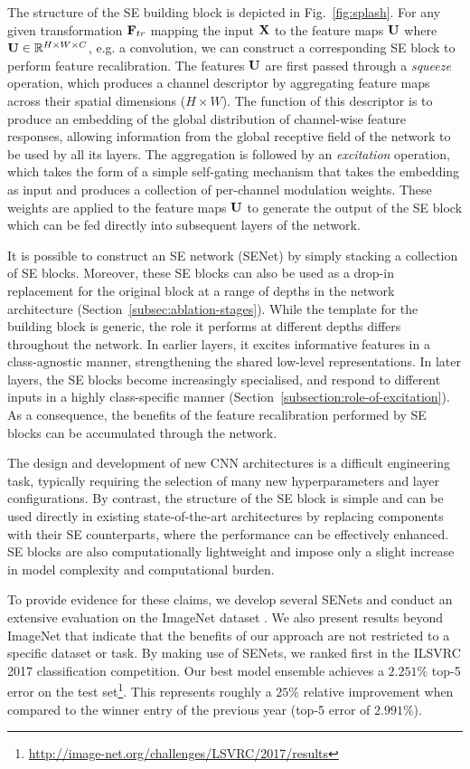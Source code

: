 The structure of the SE building block is depicted in Fig.~\ref{fig:splash}.  For any given transformation $\mathbf{F}_{tr}$ mapping the input $\mathbf{X}$ to the feature maps $\mathbf{U}$ where $\mathbf{U}\in \mathbb{R}^{H \times W \times C}$, e.g. a convolution, we can construct a corresponding SE block to perform feature recalibration. 
The features $\mathbf{U}$ are first passed through a \textit{squeeze} operation, which produces a channel descriptor by aggregating feature maps across their spatial dimensions ($H \times W$). The function of this descriptor is to produce an embedding of the global distribution of channel-wise feature responses, allowing information from the global receptive field of the network to be used by all its layers.  The aggregation is followed by an \textit{excitation} operation, which takes the form of a simple self-gating mechanism that takes the embedding as input and produces a collection of per-channel modulation weights. These weights are applied to the feature maps $\mathbf{U}$ to generate the output of the SE block which can be fed directly into subsequent layers of the network.

It is possible to construct an SE network (SENet) by simply stacking a collection of SE blocks. Moreover, these SE blocks can also be used as a drop-in replacement for the original block at a range of depths in the network architecture (Section~\ref{subsec:ablation-stages}). While the template for the building block is generic, the role it performs at different depths differs throughout the network.  In earlier layers, it excites informative features in a class-agnostic manner, strengthening the shared low-level representations.  In later layers, the SE blocks become increasingly specialised, and respond to different inputs in a highly class-specific manner (Section~\ref{subsection:role-of-excitation}).  As a consequence, the benefits of the feature recalibration performed by SE blocks can be accumulated through the network.

The design and development of new CNN architectures is a difficult engineering task, typically requiring the selection of many new hyperparameters and layer configurations.  By contrast, the structure of the SE block is simple and can be used directly in existing state-of-the-art architectures by replacing components with their SE counterparts, where the performance can be effectively enhanced. SE blocks are also computationally lightweight and impose only a slight increase in model complexity and computational burden. 

To provide evidence for these claims, we develop several SENets and conduct an extensive evaluation on the ImageNet dataset \cite{russakovsky_ijcv2015imagenet}. We also present results beyond ImageNet that indicate that the benefits of our approach are not restricted to a specific dataset or task.
By making use of SENets, we ranked first in the ILSVRC 2017 classification competition. Our best model ensemble achieves a $2.251\%$ top-5 error on the test set\footnote{\scriptsize{\url{http://image-net.org/challenges/LSVRC/2017/results}}}. This represents roughly a $25\%$ relative improvement when compared to the winner entry of the previous year (top-5 error of $2.991\%$).